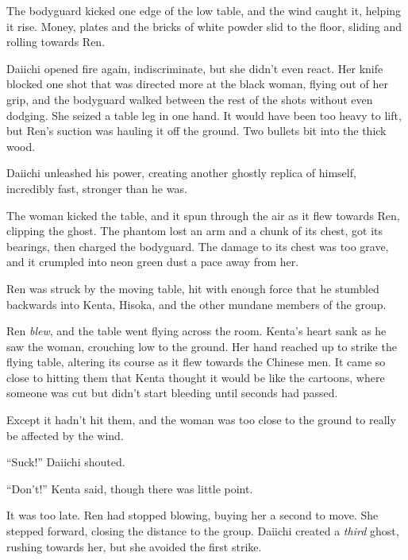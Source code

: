 The bodyguard kicked one edge of the low table, and the wind caught it, helping it rise.  Money, plates and the bricks of white powder slid to the floor, sliding and rolling towards Ren.



Daiichi opened fire again, indiscriminate, but she didn't even react.  Her knife blocked one shot that was directed more at the black woman, flying out of her grip, and the bodyguard walked between the rest of the shots without even dodging.  She seized a table leg in one hand.  It would have been too heavy to lift, but Ren's suction was hauling it off the ground.  Two bullets bit into the thick wood.



Daiichi unleashed his power, creating another ghostly replica of himself, incredibly fast, stronger than he was.



The woman kicked the table, and it spun through the air as it flew towards Ren, clipping the ghost.  The phantom lost an arm and a chunk of its chest, got its bearings, then charged the bodyguard.  The damage to its chest was too grave, and it crumpled into neon green dust a pace away from her.



Ren was struck by the moving table, hit with enough force that he stumbled backwards into Kenta, Hisoka, and the other mundane members of the group.



Ren \emph{blew}, and the table went flying across the room.  Kenta's heart sank as he saw the woman, crouching low to the ground.  Her hand reached up to strike the flying table, altering its course as it flew towards the Chinese men.  It came so close to hitting them that Kenta thought it would be like the cartoons, where someone was cut but didn't start bleeding until seconds had passed.



Except it hadn't hit them, and the woman was too close to the ground to really be affected by the wind.



``Suck!'' Daiichi shouted.



``Don't!'' Kenta said, though there was little point.



It was too late.  Ren had stopped blowing, buying her a second to move.  She stepped forward, closing the distance to the group.  Daiichi created a \emph{third} ghost, rushing towards her, but she avoided the first strike.



